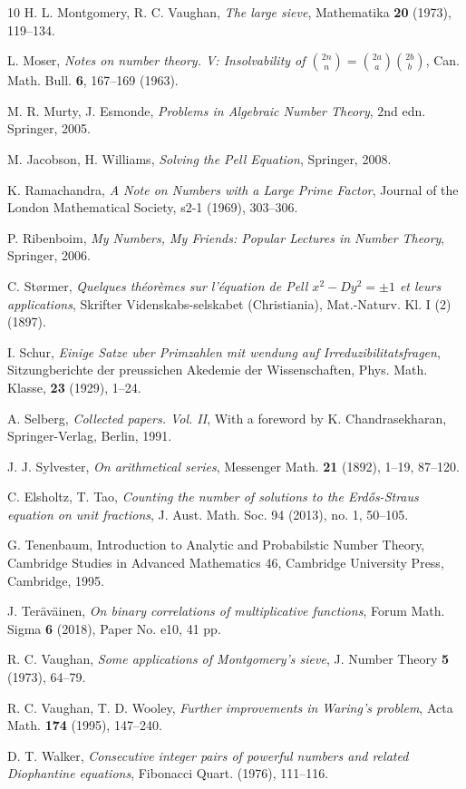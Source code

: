 \documentclass[12pt]{amsart}
\begin{document}
\begin{thebibliography}{10}
H. L. Montgomery, R. C. Vaughan, \emph{The large sieve}, Mathematika \textbf{20} (1973), 119--134.

L. Moser, \emph{Notes on number theory. V: Insolvability of $\binom{2n}{n} = \binom{2a}{a} \binom{2b}{b}$}, Can. Math. Bull. \textbf{6}, 167--169 (1963).

M. R. Murty, J. Esmonde, \emph{Problems in Algebraic Number Theory}, 2nd edn. Springer, 2005.

M. Jacobson, H. Williams, \emph{Solving the Pell Equation}, Springer, 2008.

K. Ramachandra, \emph{A Note on Numbers with a Large Prime Factor}, Journal of the London Mathematical Society, s2-1 (1969), 303--306.

P. Ribenboim, \emph{My Numbers, My Friends: Popular Lectures in Number Theory}, Springer, 2006.

C. St{\o}rmer, \emph{Quelques th\'eor\`emes sur l'\'equation de Pell $x^{2}-Dy^{2}=\pm 1$ et leurs applications}, Skrifter Videnskabs-selskabet (Christiania), Mat.-Naturv. Kl. I (2) (1897).

I. Schur, \emph{Einige Satze uber Primzahlen mit wendung auf Irreduzibilitatsfragen}, Sitzungberichte der preussichen Akedemie der Wissenschaften, Phys. Math. Klasse, \textbf{23} (1929), 1--24.

A. Selberg, \emph{Collected papers. Vol. II}, With a foreword by K. Chandrasekharan, Springer-Verlag, Berlin, 1991.

J. J. Sylvester, \emph{On arithmetical series}, Messenger Math. \textbf{21} (1892), 1--19, 87--120.

C. Elsholtz, T. Tao, \emph{Counting the number of solutions to the Erdős-Straus equation on unit fractions}, J. Aust. Math. Soc. 94 (2013), no. 1, 50--105.

G. Tenenbaum, Introduction to Analytic and Probabilstic Number Theory, Cambridge Studies
in Advanced Mathematics 46, Cambridge University Press, Cambridge, 1995.


J. Ter\"av\"ainen, \emph{On binary correlations of multiplicative functions}, Forum Math. Sigma \textbf{6} (2018), Paper No. e10, 41 pp.

R. C. Vaughan, \emph{Some applications of Montgomery's sieve}, J. Number Theory \textbf{5} (1973), 64--79.

R. C. Vaughan, T. D. Wooley, \emph{Further improvements in Waring's problem}, Acta Math. \textbf{174} (1995), 147--240.

D. T. Walker, \emph{Consecutive integer pairs of powerful numbers and related Diophantine equations}, Fibonacci Quart. (1976), 111--116.

\end{thebibliography}
\end{document}
